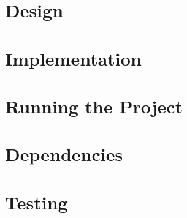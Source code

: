 \documentclass[12pt]{article}
\begin{document}
\maketitle


\section{Design}


\section{Implementation}


\section{Running the Project}


\section{Dependencies}


\section{Testing}
\end{document}
